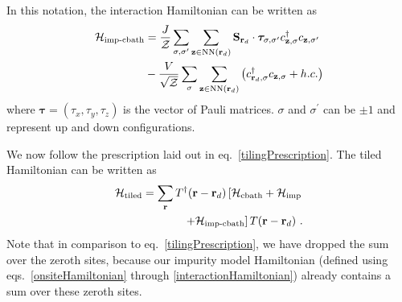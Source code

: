 \documentclass[reprint,hidelinks]{revtex4-2}
\begin{document}
In this notation, the interaction Hamiltonian can be written as
\begin{equation}\begin{aligned}\label{interactionHamiltonian}
	\mathcal{H}_\text{imp-cbath} &= \frac{J}{\mathcal{Z}}\sum_{\sigma,\sigma^\prime}\sum_{{\bf z}\in\text{NN}({\bf r}_d)} {\bf S}_{{\bf r}_d}\cdot{\boldsymbol \tau}_{\sigma,\sigma^\prime}c^\dagger_{{\bf z},\sigma}c_{{\bf z},\sigma^\prime} \\
								 & - \frac{V}{\sqrt{\mathcal{Z}}}\sum_{\sigma} \sum_{{\bf z}\in\text{NN}({\bf r}_d)}\left(c^\dagger_{{\bf r}_d,\sigma} c_{{{\bf z}},\sigma} + h.c.\right)
\end{aligned}\end{equation}
where \(\boldsymbol \tau = \left( \tau_x, \tau_y, \tau_z \right) \) is the vector of Pauli matrices. \(\sigma\) and \(\sigma^\prime\) can be \(\pm 1\) and represent up and down configurations.

We now follow the prescription laid out in eq.~\ref{tilingPrescription}. The tiled Hamiltonian can be written as 
\begin{equation}\begin{aligned}
	\mathcal{H}_\text{tiled} = \sum_{{\bf r}}T^\dagger({\bf r} - {\bf r}_d)\left[\mathcal{H}_\text{cbath} + \mathcal{H}_\text{imp} \right.\\
\left.+ \mathcal{H}_\text{imp-cbath}\right]T({\bf r} - {\bf r}_d)~.
\end{aligned}\end{equation}
Note that in comparison to eq.~\ref{tilingPrescription}, we have dropped the sum over the zeroth sites, because our impurity model Hamiltonian (defined using eqs.~\ref{onsiteHamiltonian} through \ref{interactionHamiltonian}) already contains a sum over these zeroth sites.
\end{document}
